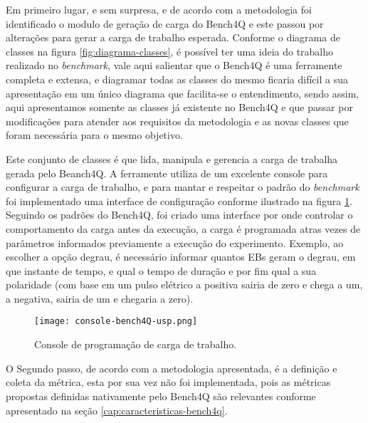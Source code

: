 Em primeiro lugar, e sem surpresa, e de acordo com a metodologia foi identificado o modulo de geração de carga do Bench4Q e este passou por alterações para gerar a carga de trabalho esperada. Conforme o diagrama de classes na figura \ref{fig:diagrama-classes}, é possível ter uma ideia do trabalho realizado no \textit{benchmark}, vale aqui salientar que o Bench4Q é uma ferramente completa e extensa, e diagramar todas as classes do mesmo ficaria difícil a sua apresentação em um único diagrama que facilita-se o entendimento, sendo assim, aqui apresentamos somente as classes já existente no Bench4Q e que passar por modificações para atender aos requisitos da metodologia e as novas classes que foram necessária para o mesmo objetivo.
 
	
Este conjunto de classes é que lida, manipula e gerencia a carga de trabalha gerada pelo Beanch4Q. A ferramente utiliza de um excelente console para configurar a carga de trabalho, e para mantar e respeitar o padrão do \textit{benchmark} foi implementado uma interface de configuração conforme ilustrado na figura \ref{fig:interface-criada-beanch4q}. Seguindo os padrões do Bench4Q, foi criado uma interface por onde controlar o comportamento da carga antes da execução, a carga é programada atras vezes de parâmetros informados previamente a execução do experimento. Exemplo, ao escolher a opção degrau, é necessário informar quantos EBs geram o degrau, em que instante de tempo, e qual o tempo de duração e por fim qual a sua polaridade (com base em um pulso elétrico a positiva sairia de zero e chega a um, a negativa, sairia de um e chegaria a zero).

\begin{figure}[htb]
	\caption{Console de programação de carga de trabalho.}
	\label{fig:interface-criada-beanch4q}
	\centering
	\texttt{[image: console-bench4Q-usp.png]}
\end{figure}
	
	


O Segundo passo, de acordo com a metodologia apresentada, é a definição e coleta da métrica, esta por sua vez não foi implementada, pois as métricas propostas definidas nativamente pelo Bench4Q são relevantes conforme apresentado na seção \ref{cap:caracteristicas-bench4q}.

